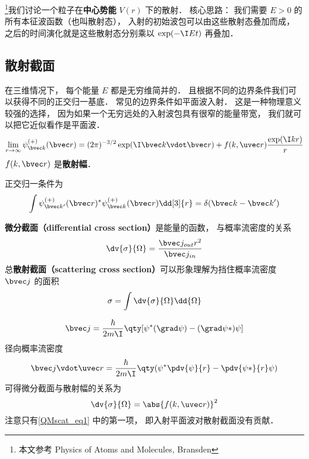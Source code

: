 
\footnote{本文参考 Physics of Atoms and Molecules, Bransden}我们讨论一个粒子在\textbf{中心势能} $V(r)$ 下的散射． 核心思路： 我们需要 $E > 0$ 的所有本征波函数（也叫散射态）， 入射的初始波包可以由这些散射态叠加而成， 之后的时间演化就是这些散射态分别乘以 $\exp(-\I E t)$ 再叠加．

\subsection{散射截面}
在三维情况下， 每个能量 $E$ 都是无穷维简并的． 且根据不同的边界条件我们可以获得不同的正交归一基底． 常见的边界条件如平面波入射． 这是一种物理意义较强的选择， 因为如果一个无穷远处的入射波包具有很窄的能量带宽， 我们就可以把它近似看作是平面波．
\begin{equation}\label{QMscat_eq1}
\lim_{r \to \infty} \psi_{\bvec k}^{(+)}(\bvec r) = (2\pi)^{-3/2} \exp(\I \bvec k \vdot \bvec r) + f(k, \uvec r) \frac{\exp(\I k r)}{r}
\end{equation}
$f(k, \bvec r)$ 是\textbf{散射幅}．

正交归一条件为
\begin{equation}
\int \psi_{\bvec k'}^{(+)}(\bvec r)^* \psi_{\bvec k}^{(+)}(\bvec r) \dd[3]{r} = \delta(\bvec k - \bvec k')
\end{equation}


\textbf{微分截面（differential cross section）}是能量的函数， 与概率流密度的关系
\begin{equation}
\dv{\sigma}{\Omega} = \frac{\bvec j_{out} r^2}{\bvec j_{in}}
\end{equation}
总\textbf{散射截面（scattering cross section）}可以形象理解为挡住概率流密度 $\bvec j$ 的面积
\begin{equation}
\sigma = \int\dv{\sigma}{\Omega} \dd{\Omega}
\end{equation}

\begin{equation}
\bvec j = \frac{\hbar}{2m\I}\qty[\psi^*(\grad \psi) - (\grad \psi*)\psi]
\end{equation}
径向概率流密度
\begin{equation}
\bvec j \vdot \uvec r = \frac{\hbar}{2m\I} \qty(\psi^*\pdv{\psi}{r} - \pdv{\psi*}{r} \psi)
\end{equation}
可得微分截面与散射幅的关系为
\begin{equation}
\dv{\sigma}{\Omega} = \abs{f(k, \uvec r)}^2
\end{equation}
注意只有\autoref{QMscat_eq1} 中的第一项， 即入射平面波对散射截面没有贡献．

